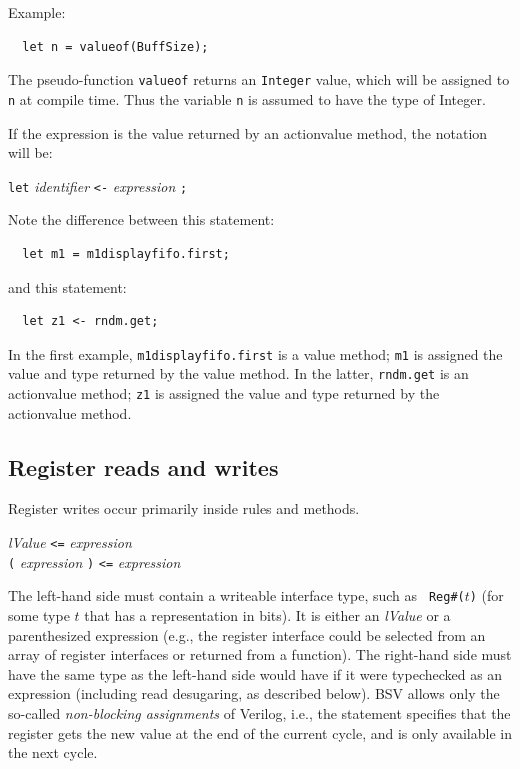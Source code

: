 \documentclass[twoside,letterpaper]{article}
\newcommand{\hm}{\hspace*{1em}}
\newcommand{\BSV}{BSV}
\newcommand{\V}{Verilog}
\newcommand{\nterm}[1]{\emph{#1}}
\newcommand{\term}[1]{\texttt{#1}}
\newcommand{\alt}{{$\mid$}}
\newcommand{\gram}[2]{    \hm\makebox[10em][l]{\it #1}\makebox[1.5em][l]{::=}    #2}
\newcommand{\gramalt}[1]{ \hm\makebox[10em][l]{      }\makebox[1.5em][l]{\alt}   #1}
\begin{document}
Example:
\begin{verbatim}
  let n = valueof(BuffSize);
\end{verbatim}

The pseudo-function \texttt{valueof} returns an \texttt{Integer} value,
which will be assigned to \texttt{n} at compile time.  Thus the variable
\texttt{n} is assumed to have the type of Integer.

If the expression is the value returned by an actionvalue method, the
notation will be:

\gram{varAssign}{\term{let} \nterm{identifier} \term{<-} \nterm{expression} \term{;} }

Note the difference between this statement:
\begin{verbatim}
  let m1 = m1displayfifo.first;
\end{verbatim}
and this statement:
\begin{verbatim}
  let z1 <- rndm.get;
\end{verbatim}

In the first example, \texttt{m1displayfifo.first} is a value method; \texttt{m1} is assigned the
value and type returned by the value method.  In the latter, \texttt{rndm.get} is
an actionvalue method; \texttt{z1} is assigned the value and type
returned by the actionvalue method.


\subsection{Register reads and writes}

\label{sec-reg-write}

Register writes occur primarily inside rules and methods.

\gram{regWrite}{ \nterm{lValue} \term{<=} \nterm{expression} } \\
\gramalt       { \term{(} \nterm{expression} \term{)} \term{<=} \nterm{expression} }

The left-hand side must contain a writeable interface type, such as {\tt
Reg\#($t$)} (for some type $t$ that has a representation in bits).  It is
either an \nterm{lValue} or a parenthesized expression (e.g., the register
interface could be selected from an array of register interfaces or returned
from a function). The right-hand side must have the same type as the left-hand
side would have if it were typechecked as an expression (including read 
desugaring, as described below). {\BSV} allows only the so-called 
\emph{non-blocking assignments} of {\V}, i.e., the statement specifies that 
the register gets the new value at the end of the current cycle, and is only 
available in the next cycle.
\end{document}
